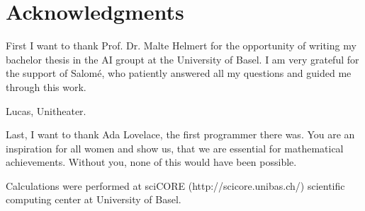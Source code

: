 \chapter{Acknowledgments}
First I want to thank Prof. Dr. Malte Helmert for the opportunity of writing my bachelor thesis in the AI groupt at the University of Basel.
I am very grateful for the support of Salom\'e, who patiently answered all my questions and guided me through this work.

Lucas, Unitheater.

Last, I want to thank Ada Lovelace, the first programmer there was.
You are an inspiration for all women and show us, that we are essential for mathematical achievements.
Without you, none of this would have been possible.

Calculations were performed at sciCORE (http://scicore.unibas.ch/) scientific computing center at University of Basel.